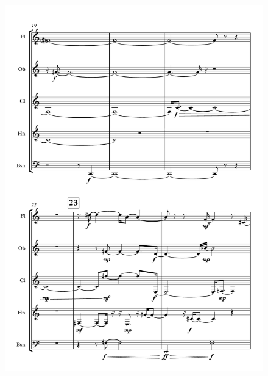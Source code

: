\begin{figure}[H]
    \centering
	\includegraphics[width=6.5in]{figures/Out_of_Focus_4.pdf}
\end{figure}

